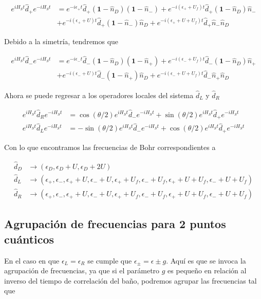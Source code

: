 \begin{appendixs}
\begin{align*}
    e^{i H_{S}t}\hat{d}_{+}e^{-iH_{S}t} & = e^{-i\epsilon_{+}t}\hat{d}_{+}(\textbf{1}-\hat{n}_{D})(\textbf{1}-\hat{n}_{-}) + e^{-i(\epsilon_{+}+U_{f})t} \hat{d}_{+}(\textbf{1}-\hat{n}_{D})\hat{n}_{-} \\
    & + e^{-i(\epsilon_{+}+U)t}\hat{d}_{+}(\textbf{1}-\hat{n}_{-})\hat{n}_{D} + e^{-i(\epsilon_{+}+U+U_{f})t}\hat{d}_{+}\hat{n}_{-}\hat{n}_{D}
\end{align*}

Debido a la simetría, tendremos que

\begin{align*}
    e^{i H_{S}t}\hat{d}_{-}e^{-iH_{S}t} & = e^{-i\epsilon_{-}t}\hat{d}_{-}(\textbf{1}-\hat{n}_{D})(\textbf{1}-\hat{n}_{+}) + e^{-i(\epsilon_{-}+U_{f})t} \hat{d}_{-}(\textbf{1}-\hat{n}_{D})\hat{n}_{+} \\
    & + e^{-i(\epsilon_{-}+U)t}\hat{d}_{-}(\textbf{1}-\hat{n}_{+})\hat{n}_{D} + e^{-i(\epsilon_{-}+U+U_{f})t}\hat{d}_{-}\hat{n}_{+}\hat{n}_{D}
\end{align*}

Ahora se puede regresar a los operadores locales del sistema $\hat{d}_{L}$ y $\hat{d}_{R}$

\begin{align*}
    e^{iH_{S}t}\hat{d}_{R}e^{-iH_{S}t} & = \cos(\theta/2)e^{iH_{S}t}\hat{d}_{-}e^{-iH_{S}t} + \sin(\theta/2)e^{iH_{S}t}\hat{d}_{+}e^{-iH_{S}t}  \\
    e^{iH_{S}t}\hat{d}_{L}e^{-iH_{S}t} & = -\sin(\theta/2)e^{iH_{S}t}\hat{d}_{-}e^{-iH_{S}t} + \cos(\theta/2)e^{iH_{S}t}\hat{d}_{+}e^{-iH_{S}t}
\end{align*}

Con lo que encontramos las frecuencias de Bohr correspondientes a

\begin{align*}
    \hat{d}_{D} & \to (\epsilon_{D}, \epsilon_{D}+U,\epsilon_{D}+2U) \\
    \hat{d}_{L} & \to (\epsilon_{+},\epsilon_{-},\epsilon_{+}+U,\epsilon_{-}+U,\epsilon_{+}+U_{f},\epsilon_{-}+U_{f},\epsilon_{+}+U+U_{f},\epsilon_{-}+U+U_{f}) \\
    \hat{d}_{R} & \to (\epsilon_{+},\epsilon_{-},\epsilon_{+}+U,\epsilon_{-}+U,\epsilon_{+}+U_{f},\epsilon_{-}+U_{f},\epsilon_{+}+U+U_{f},\epsilon_{-}+U+U_{f})
\end{align*}

\label{apendix5jumpop}

\subsection{Agrupación de frecuencias para 2 puntos cuánticos}
En el caso en que $\epsilon_{L} = \epsilon_{R}$ se cumple que $\epsilon_{\pm} = \epsilon \pm g$. Aquí es que se invoca la agrupación de frecuencias, ya que si el parámetro $g$ es pequeño en relación al inverso del tiempo de correlación del baño, podremos agrupar las frecuencias tal que


\end{appendixs}
